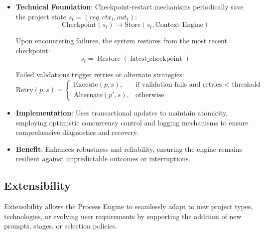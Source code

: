 \documentclass[11pt,a4paper]{article}
\begin{document}
\begin{itemize}
    \item \textbf{Technical Foundation}:
    Checkpoint-restart mechanisms periodically save the project state \( s_t = (req, ctx_t, out_t) \):
    \[
    \text{Checkpoint}(s_t) \rightarrow \text{Store}(s_t, \text{Context Engine})
    \]

    Upon encountering failures, the system restores from the most recent checkpoint:
    \[
    s_t = \operatorname{Restore}(\operatorname{latest\_checkpoint})
    \]

    Failed validations trigger retries or alternate strategies:
    \[
    \text{Retry}(p, s) =
    \begin{cases}
        \text{Execute}(p, s), & \text{if validation fails and retries < threshold} \\
        \text{Alternate}(p', s), & \text{otherwise}
    \end{cases}
    \]

    \item \textbf{Implementation}:
    Uses transactional updates to maintain atomicity, employing optimistic concurrency control and logging mechanisms to ensure comprehensive diagnostics and recovery.

    \item \textbf{Benefit}:
    Enhances robustness and reliability, ensuring the engine remains resilient against unpredictable outcomes or interruptions.
\end{itemize}

\subsection{Extensibility}
\label{subsec:extensibility}

Extensibility allows the Process Engine to seamlessly adapt to new project types, technologies, or evolving user requirements by supporting the addition of new prompts, stages, or selection policies.
\end{document}
